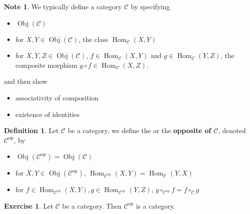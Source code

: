 \documentclass[12pt]{amsart}
\theoremstyle{definition}
\newtheorem{defn}[definition]{Definition}
\newtheorem{note}[definition]{Note}
\newtheorem{ex}[definition]{Exercise}
\newcommand{\MC}{\mathcal{C}}
\newcommand{\op}[1]{\mathcal{#1}^{\text{op}}}
\DeclareMathOperator{\Obj}{Obj}
\DeclareMathOperator{\Hom}{Hom}
\begin{document}
	\begin{note}
		We typically define a category $\MC$ by specifying 
		\begin{itemize}
			\item $\Obj(\MC)$
			\item for $X,Y \in \Obj(\MC)$, the class $\Hom_{\MC}(X, Y)$
			\item for $X,Y,Z \in \Obj(\MC)$, $f \in \Hom_{\MC}(X, Y)$ and $g \in \Hom_{\MC}(Y, Z)$, the composite morphism $g \circ f \in \Hom_{\MC}(X,Z)$.
		\end{itemize}
		and then show 
		\begin{itemize}
			\item associativity of composition 
			\item existence of identities 
		\end{itemize}
	\end{note}

	\begin{defn}
		Let $\MC$ be a category, we define the \text{dual of $\MC$} or the \textbf{opposite of $\MC$}, denoted $\op{C}$, by 
		\begin{itemize}
			\item $\Obj(\op{C}) = \Obj(\MC)$
			\item for $X,Y \in \Obj(\op{C})$, $\Hom_{\op{C}}(X,Y) = \Hom_{\MC}(Y,X)$
			\item for $f \in \Hom_{\op{C}}(X, Y), g \in \Hom_{\op{C}}(Y,Z)$, $g \circ_{\op{C}} f = f \circ_{\MC} g$
		\end{itemize}
	\end{defn}

	\begin{ex}
		Let $\MC$ be a category. Then $\op{C}$ is a category.
	\end{ex}
	
\end{document}
